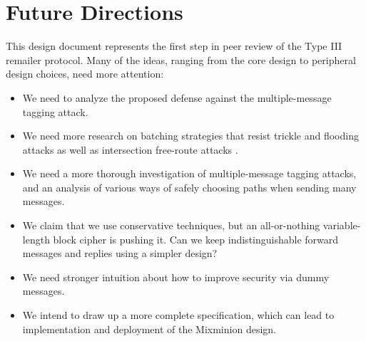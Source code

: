 \documentclass{llncs}
\begin{document}

\section{Future Directions}
\label{sec:conclusion}

This design document represents the first step in peer review of the
Type III remailer protocol. Many of the ideas, ranging from the core
design to peripheral design choices, need more attention:

\begin{itemize}
\item We need to analyze the proposed defense against the multiple-message
tagging attack.
\item We need more research on batching strategies that resist trickle
and flooding attacks \cite{batching-taxonomy} as well as intersection
free-route attacks \cite{disad-free-routes}.
\item We need a more thorough investigation of multiple-message tagging
attacks, and an analysis of various ways of safely choosing paths when
sending many messages.
\item We claim that we use conservative techniques, but an all-or-nothing
variable-length block cipher is pushing it. Can we keep indistinguishable
forward messages and replies using a simpler design?
\item We need stronger intuition about how to improve security via
dummy messages.
\item We intend to draw up a more complete specification, which can lead
to implementation and deployment of the Mixminion design.
\end{itemize}







\end{document}
